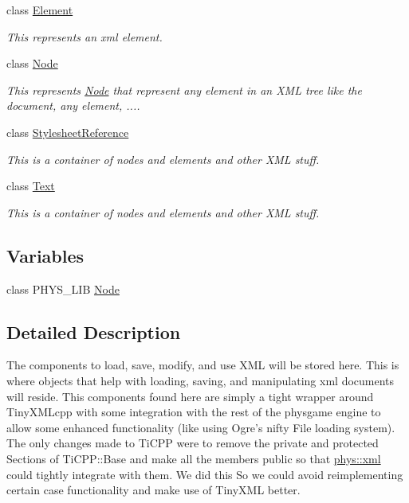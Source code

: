 \begin{DoxyCompactItemize}
class \hyperlink{classphys_1_1xml_1_1Element}{Element}
\begin{DoxyCompactList}\small\item\em This represents an xml element. \item\end{DoxyCompactList}\item 
class \hyperlink{classphys_1_1xml_1_1Node}{Node}
\begin{DoxyCompactList}\small\item\em This represents \hyperlink{classphys_1_1xml_1_1Node}{Node} that represent any element in an XML tree like the document, any element, .... \item\end{DoxyCompactList}\item 
class \hyperlink{classphys_1_1xml_1_1StylesheetReference}{StylesheetReference}
\begin{DoxyCompactList}\small\item\em This is a container of nodes and elements and other XML stuff. \item\end{DoxyCompactList}\item 
class \hyperlink{classphys_1_1xml_1_1Text}{Text}
\begin{DoxyCompactList}\small\item\em This is a container of nodes and elements and other XML stuff. \item\end{DoxyCompactList}\end{DoxyCompactItemize}
\subsection*{Variables}
\begin{DoxyCompactItemize}
\item 
class PHYS\_\-LIB \hyperlink{namespacephys_1_1xml_ab52f16bbf03980beb1c58fa15423a681}{Node}
\end{DoxyCompactItemize}


\subsection{Detailed Description}
The components to load, save, modify, and use XML will be stored here. This is where objects that help with loading, saving, and manipulating xml documents will reside. This components found here are simply a tight wrapper around TinyXMLcpp with some integration with the rest of the physgame engine to allow some enhanced functionality (like using Ogre's nifty File loading system). The only changes made to TiCPP were to remove the private and protected Sections of TiCPP::Base and make all the members public so that \hyperlink{namespacephys_1_1xml}{phys::xml} could tightly integrate with them. We did this So we could avoid reimplementing certain case functionality and make use of TinyXML better. \par
 \par


